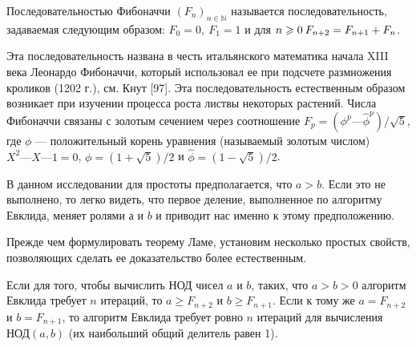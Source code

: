 \documentclass{mai_book}
\begin{document}
\begin{determ}
\hspace*{15pt}Последовательностью Фибоначчи $(F_n)_{n \in \mathbb{N}}$ называется  
последовательность, задаваемая следующим образом: $F_0 = 0,\: F_1 = 1$ и для $n \geqslant 0\:
F_{n+2} = \newline F_{n+1} + F_n$.
\end{determ}

\begin{mynotice} 
Эта последовательность названа в честь  
итальянского математика начала XIII века Леонардо Фибоначчи,  
который использовал ее при подсчете размножения кроликов (1202 г.), 
см. Кнут [97]. Эта последовательность естественным образом  
возникает при изучении процесса роста листвы некоторых растений. 
Числа Фибоначчи связаны с золотым сечением через  
соотношение $F_p = (\phi^p — \hat{\phi}^p)\slash \sqrt{5}$, где $\phi$ — положительный корень уравнения 
(называемый золотым числом) $X^2 — X — 1 = 0$, $\phi = (1 + \sqrt{5})\slash 2$ и 
$\hat{\phi} = (1 - \sqrt{5})\slash 2$.\newline 
\end{mynotice}

В данном исследовании для простоты предполагается, что $a > b$. 
Если это не выполнено, то легко видеть, что первое деление,  
выполненное по алгоритму Евклида, меняет ролями $а$ и $b$ и приводит нас именно 
к этому предположению.
 
Прежде чем формулировать теорему Ламе, установим несколько 
простых свойств, позволяющих сделать ее доказательство более  
естественным. 

\begin{property}
\hspace*{15pt}Если для того, чтобы вычислить $\text{НОД}$ чисел $a$ и $b$, таких, что 
$a > b > 0$ алгоритм Евклида требует $n$ итераций, то $a \geqslant F_{n+2}$ и 
$b \geqslant F_{n+1}$. Если к тому же $a = F_{n+2}$ и $b = F_{n+1}$, то алгоритм Евклида 
требует ровно $n$ итераций для вычисления $\text{НОД}(a, b)$ (их наибольший 
общий делитель равен 1). 
\end{property}
\end{document}

